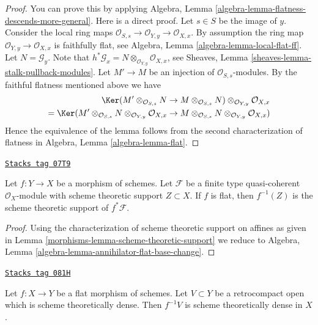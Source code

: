 \begin{proof}
You can prove this by applying
Algebra, Lemma \ref{algebra-lemma-flatness-descends-more-general}.
Here is a direct proof. Let $s \in S$ be the image of $y$.
Consider the local ring maps
$\mathcal{O}_{S, s} \to \mathcal{O}_{Y, y} \to \mathcal{O}_{X, x}$.
By assumption the ring map $\mathcal{O}_{Y, y} \to \mathcal{O}_{X, x}$
is faithfully flat, see
Algebra, Lemma \ref{algebra-lemma-local-flat-ff}.
Let $N = \mathcal{G}_y$. Note that
$h^*\mathcal{G}_x = N \otimes_{\mathcal{O}_{Y, y}} \mathcal{O}_{X, x}$, see
Sheaves, Lemma \ref{sheaves-lemma-stalk-pullback-modules}.
Let $M' \to M$ be an injection of $\mathcal{O}_{S, s}$-modules.
By the faithful flatness mentioned above we have
\begin{align*}
\Ker(
M' \otimes_{\mathcal{O}_{S, s}} N \to M \otimes_{\mathcal{O}_{S, s}} N)
\otimes_{\mathcal{O}_{Y, y}} \mathcal{O}_{X, x} \\
=
\Ker(
M' \otimes_{\mathcal{O}_{S, s}} N
\otimes_{\mathcal{O}_{Y, y}} \mathcal{O}_{X, x}
\to
M \otimes_{\mathcal{O}_{S, s}} N
\otimes_{\mathcal{O}_{Y, y}} \mathcal{O}_{X, x})
\end{align*}
Hence the equivalence of the lemma follows from the second characterization
of flatness in
Algebra, Lemma \ref{algebra-lemma-flat}.
\end{proof}

\begin{lemma}
\label{morphisms-lemma-flat-pullback-support}
\href{https://stacks.math.columbia.edu/tag/07T9}{\texttt{Stacks tag 07T9}}

Let $f : Y \to X$ be a morphism of schemes. Let $\mathcal{F}$ be
a finite type quasi-coherent $\mathcal{O}_X$-module with scheme
theoretic support $Z \subset X$. If $f$ is flat,
then $f^{-1}(Z)$ is the scheme theoretic support of $f^*\mathcal{F}$.
\end{lemma}

\begin{proof}

Using the characterization of scheme theoretic support on affines
as given in Lemma \ref{morphisms-lemma-scheme-theoretic-support} we reduce to
Algebra, Lemma \ref{algebra-lemma-annihilator-flat-base-change}.
\end{proof}

\begin{lemma}
\label{morphisms-lemma-flat-morphism-scheme-theoretically-dense-open}
\href{https://stacks.math.columbia.edu/tag/081H}{\texttt{Stacks tag 081H}}

Let $f : X \to Y$ be a flat morphism of schemes. Let $V \subset Y$ be
a retrocompact open which is scheme theoretically dense. Then $f^{-1}V$
is scheme theoretically dense in $X$.
\end{lemma}


